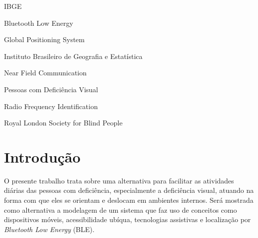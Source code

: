 \documentclass[english,brazilian]{UNISINOSmonografia}
\begin{document}
\begin{listadesiglas}{IBGE}
\item[BLE] Bluetooth Low Energy
\item[GPS] Global Positioning System
\item[IBGE] Instituto Brasileiro de Geografia e Estatística
\item[NFC] Near Field Communication
\item[PDV] Pessoas com Deficiência Visual
\item[RFID] Radio Frequency Identification
\item[RLSB]	Royal London Society for Blind People
\end{listadesiglas}

\tableofcontents

\chapter{Introdução} %
O presente trabalho trata sobre uma alternativa para facilitar as atividades diárias das pessoas com deficiência, especialmente a deficiência visual, atuando na forma com que eles se orientam e deslocam em ambientes internos.
Será mostrada como alternativa a modelagem de um sistema que faz uso de conceitos como dispositivos móveis, acessibilidade ubíqua, tecnologias assistivas e localização por \textit{Bluetooth Low Energy} (BLE).
\end{document}
